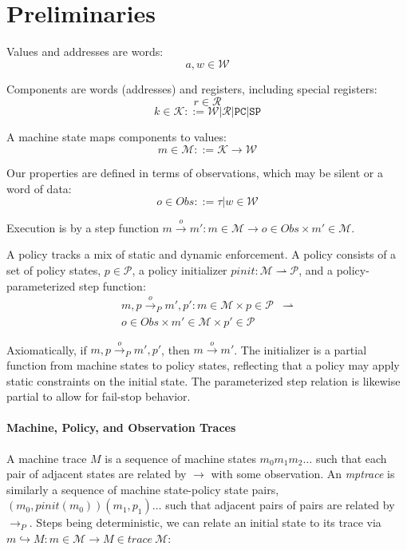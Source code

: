 \documentclass[conference]{IEEEtran}
\begin{document}
  \section{Preliminaries}

    Values and addresses are words:
    \[a,w \in \mathcal{W}\]

    Components are words (addresses) and registers, including special registers:
    \[r \in \mathcal{R}\]
    \[k \in \mathcal{K} ::= \mathcal{W} | \mathcal{R} | \mathtt{PC} | \mathtt{SP}\]

    A machine state maps components to values:
    \[m \in \mathcal{M} ::= \mathcal{K} \rightarrow \mathcal{W}\]

    Our properties are defined in terms of observations, which may be silent or a word of data:
    \[o \in \mathit{Obs} ::= \tau | w \in \mathcal{W}\]
    
    Execution is by a step function \(m \xrightarrow{o} m' : m \in \mathcal{M} \rightarrow
    o \in \mathit{Obs} \times m' \in \mathcal{M}\).

    A policy tracks a mix of static and dynamic enforcement. A policy consists of
    a set of policy states, \(p \in \mathcal{P}\), a policy initializer
    \(pinit : \mathcal{M} \rightharpoonup \mathcal{P}\), and a policy-parameterized step function:
    \[\begin{split}
      m, p \xrightarrow{o}_P m', p' : m \in \mathcal{M} \times p \in \mathcal{P} & \rightharpoonup \\
      o \in \mathit{Obs} \times m' \in \mathcal{M} \times p' \in \mathcal{P} &
    \end{split}\]

    Axiomatically, if \(m,p \xrightarrow{o}_P m',p'\), then \(m \xrightarrow{o} m'\).
    The initializer is a partial function from machine states to policy
    states, reflecting that a policy may apply static constraints on the initial state. The parameterized
    step relation is likewise partial to allow for fail-stop behavior.

  \paragraph{Machine, Policy, and Observation Traces}

    A machine trace \(M\) is a sequence of machine states \(m_0 m_1 m_2 \dots\) such that each
    pair of adjacent states are related by \(\longrightarrow\) with some observation. An
    {\it mptrace} is similarly a sequence of machine state-policy state pairs,
    \((m_0,\mathit{pinit}(m_0))(m_1,p_1) \dots\) such that adjacent pairs of pairs are related
    by \(\longrightarrow_P\). Steps being deterministic, we can relate an initial state to its trace
    via \(m \hookrightarrow M : m \in \mathcal{M} \rightarrow M \in \mathit{trace}\ \mathcal{M}\):
\end{document}
